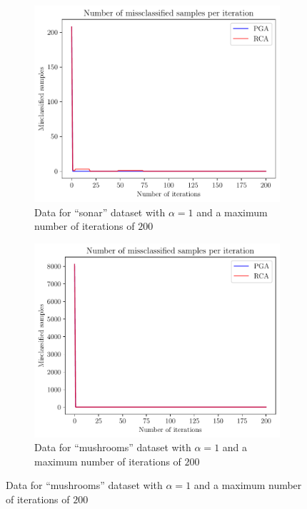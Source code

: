\documentclass{article}
\begin{document}
\begin{itemize}
           \begin{figure}[h!]
                \centering
                \begin{subfigure}{0.45\textwidth}
                    \centering
                    \includegraphics[width=\linewidth]{../code/plots/tiny_miss_plot.pdf}
                    \caption{Data for ``sonar'' dataset with $\alpha = 1$ and
                    a maximum number of iterations of $200$}
                    \label{miss_sonar}
                \end{subfigure}
                \hfill
                \begin{subfigure}{0.45\textwidth}
                    \centering
                    \includegraphics[width=\linewidth]{../code/plots/small_miss_plot.pdf}
                    \caption{Data for ``mushrooms'' dataset with $\alpha = 1$ and
                    a maximum number of iterations of $200$}
                    \label{miss_mushrooms}
                \end{subfigure}
                \label{fig:miss}
           \end{figure}


\end{itemize}
\end{document}
